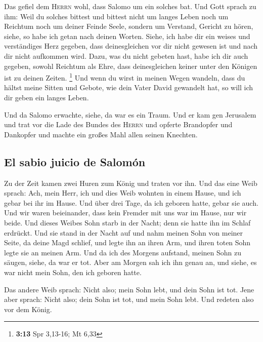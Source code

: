  Das gefiel dem \textsc{Herrn} wohl, dass Salomo um ein
solches bat.  Und Gott sprach zu ihm: Weil du solches
bittest und bittest nicht um langes Leben noch um Reichtum noch um
deiner Feinde Seele, sondern um Verstand, Gericht zu hören,
 siehe, so habe ich getan nach deinen Worten. Siehe, ich
habe dir ein weises und verständiges Herz gegeben, dass deinesgleichen
vor dir nicht gewesen ist und nach dir nicht aufkommen wird.
 Dazu, was du nicht gebeten hast, habe ich dir auch
gegeben, sowohl Reichtum als Ehre, dass deinesgleichen keiner unter den
Königen ist zu deinen Zeiten. \footnote{\textbf{3:13} Spr 3,13-16; Mt
  6,33}  Und wenn du wirst in meinen Wegen wandeln, dass
du hältst meine Sitten und Gebote, wie dein Vater David gewandelt hat,
so will ich dir geben ein langes Leben.

 Und da Salomo erwachte, siehe, da war es ein Traum. Und
er kam gen Jerusalem und trat vor die Lade des Bundes des \textsc{Herrn}
und opferte Brandopfer und Dankopfer und machte ein großes Mahl allen
seinen Knechten.

\hypertarget{el-sabio-juicio-de-salomuxf3n}{%
\subsection{El sabio juicio de
Salomón}\label{el-sabio-juicio-de-salomuxf3n}}

 Zu der Zeit kamen zwei Huren zum König und traten vor
ihn.  Und das eine Weib sprach: Ach, mein Herr, ich und
dies Weib wohnten in einem Hause, und ich gebar bei ihr im Hause.
 Und über drei Tage, da ich geboren hatte, gebar sie
auch. Und wir waren beieinander, dass kein Fremder mit uns war im Hause,
nur wir beide.  Und dieses Weibes Sohn starb in der
Nacht; denn sie hatte ihn im Schlaf erdrückt.  Und sie
stand in der Nacht auf und nahm meinen Sohn von meiner Seite, da deine
Magd schlief, und legte ihn an ihren Arm, und ihren toten Sohn legte sie
an meinen Arm.  Und da ich des Morgens aufstand, meinen
Sohn zu säugen, siehe, da war er tot. Aber am Morgen sah ich ihn genau
an, und siehe, es war nicht mein Sohn, den ich geboren hatte.

 Das andere Weib sprach: Nicht also; mein Sohn lebt, und
dein Sohn ist tot. Jene aber sprach: Nicht also; dein Sohn ist tot, und
mein Sohn lebt. Und redeten also vor dem König.

